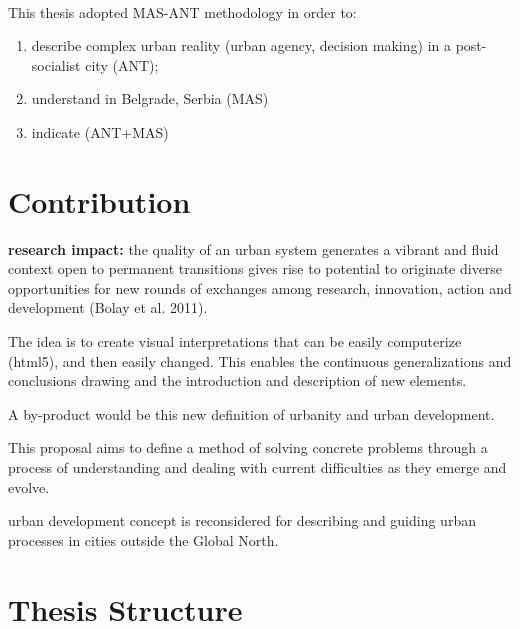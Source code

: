 \documentclass[11pt]{report}
\begin{document}
\\
This thesis adopted MAS-ANT methodology in order to:
\begin{enumerate}
\item describe complex urban reality  (urban agency, decision making)  in a post-socialist city (ANT);
\item understand   in Belgrade, Serbia (MAS)
\item indicate   (ANT+MAS) 
\end{enumerate}

\section{Contribution}



\textbf{research impact:} the quality of an urban system generates a vibrant and fluid context open to permanent transitions gives rise to potential to originate diverse opportunities for new rounds of exchanges among research, innovation, action and development (Bolay et al. 2011).

The idea is to create visual interpretations that can be easily computerize (html5), and then easily changed. This enables the continuous generalizations and conclusions drawing and the introduction and description of new elements.

A by-product would be this new definition of urbanity and urban development.

This proposal aims to define a method of solving concrete problems through a process of understanding and dealing with current difficulties as they emerge and evolve.

urban development concept is reconsidered for describing and guiding urban processes in cities outside the Global North.

\section{Thesis Structure}
\end{document}
